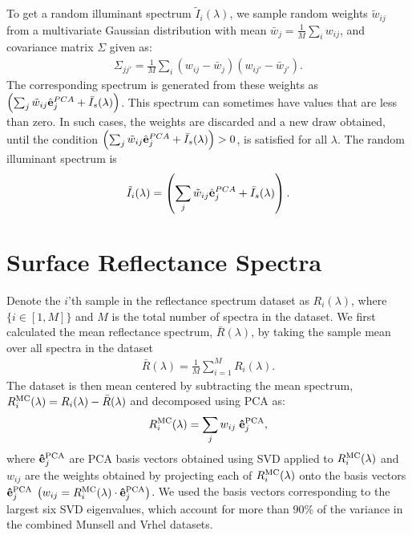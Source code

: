 \documentclass[10pt,english]{article}
\begin{document}

To get a random illuminant spectrum $\tilde{I}_i(\lambda)$, we sample random weights $\tilde{w}_{ij}$ from  
a multivariate Gaussian distribution with mean $\bar{w}_j = \frac{1}{M}\sum_i w_{ij}$, 
and covariance matrix $\Sigma$ given as:
\begin{align}
\Sigma_{jj'} = \frac{1}{M} \sum_i \left(w_{ij} -\bar{w}_j\right)\left(w_{ij'} -\bar{w}_{j'}\right).
\end{align}
The corresponding spectrum is generated from these weights as $\left( \sum_j \tilde{w}_{ij} \hat{{\bf e}}_j^{PCA} +  \bar{I}_{s} (\lambda)\right)$.
This spectrum can sometimes have values that are less than zero. 
In such cases, the weights are discarded and a new draw obtained, until
the condition $\left( \sum_j \tilde{w}_{ij} \hat{{\bf e}}_j^{PCA} +  \bar{I}_{s} (\lambda)\right) > 0$, is satisfied for all $\lambda$.
The random illuminant spectrum is
\begin{align}
\tilde{I}_i(\lambda) = \left( \sum_j \tilde{w}_{ij} \hat{{\bf e}}_j^{PCA} +  \bar{I}_{s} (\lambda)\right).
\end{align}

\section{Surface Reflectance Spectra}
Denote the $i$'th sample in the reflectance spectrum dataset as $R_i(\lambda)$, where $\{i \in [1,M]\}$ 
and $M$ is the total number of spectra in the dataset. 
We first calculated the mean reflectance spectrum,
$\bar{R}(\lambda)$, by taking the sample mean over all spectra in the dataset
\begin{align}
\bar{R}(\lambda) = \frac{1}{M} \sum_{i=1}^M R_i(\lambda).\end{align} 
The dataset is then mean centered by subtracting the mean spectrum, $R_i^{\rm MC}(\lambda) =  R_i(\lambda)-\bar{R}(\lambda)$ 
and decomposed using PCA as:
\begin{align}
R_i^{\rm MC}(\lambda) = \sum_j{w_{ij} \; {\bf \hat{e}}_j^{\rm PCA}},
\end{align} 
where ${\bf \hat{e}}_j^{\rm PCA}$ are PCA basis vectors obtained using SVD applied to $R_i^{\rm MC}(\lambda)$
and $w_{ij}$ are the weights obtained by projecting each of $R_i^{\rm MC}(\lambda)$ onto the basis vectors ${\bf \hat{e}}_j^{\rm PCA}$ 
$\left( w_{ij} = R_i^{\rm MC}(\lambda)\cdot {\bf \hat{e}}_j^{\rm PCA}\right)$. 
We used the basis vectors corresponding to the largest six SVD eigenvalues, which account for
more than $90\%$ of the variance in the combined Munsell and Vrhel datasets.
\end{document}
